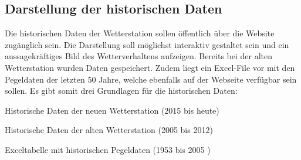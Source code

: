 






\subsection{Darstellung der historischen Daten}
Die historischen Daten der Wetterstation sollen öffentlich über die Website zugänglich sein. Die Darstellung soll möglichst interaktiv gestaltet sein und ein aussagekräftiges Bild des Wetterverhaltens aufzeigen. Bereits bei der alten Wetterstation wurden Daten gespeichert. Zudem liegt ein Excel-File vor mit den Pegeldaten der letzten 50 Jahre, welche ebenfalls auf der Webseite verfügbar sein sollen. Es gibt somit drei Grundlagen für die historischen Daten:

\begin{itemize*}
\item Historische Daten der neuen Wetterstation (2015 bis heute)
\item Historische Daten der alten Wetterstation (2005 bis 2012)
\item Exceltabelle mit historischen Pegeldaten (1953 bis 2005 )
\end{itemize*}

